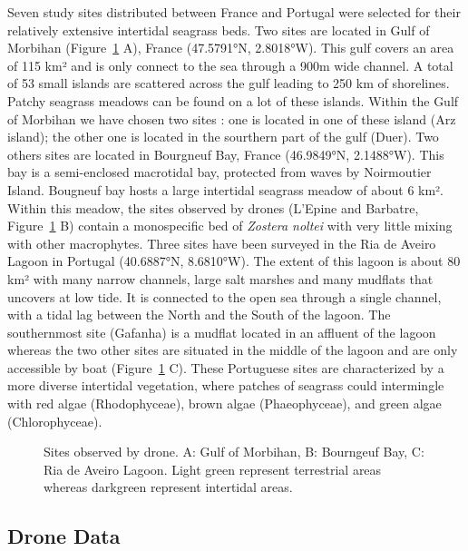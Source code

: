 \documentclass[
  number]{elsarticle}
\begin{document}
Seven study sites distributed between France and Portugal were selected
for their relatively extensive intertidal seagrass beds. Two sites are
located in Gulf of Morbihan (Figure~\ref{fig-map} A), France (47.5791°N,
2.8018°W). This gulf covers an area of 115 km² and is only connect to
the sea through a 900m wide channel. A total of 53 small islands are
scattered across the gulf leading to 250 km of shorelines. Patchy
seagrass meadows can be found on a lot of these islands. Within the Gulf
of Morbihan we have chosen two sites : one is located in one of these
island (Arz island); the other one is located in the sourthern part of
the gulf (Duer). Two others sites are located in Bourgneuf Bay, France
(46.9849°N, 2.1488°W). This bay is a semi-enclosed macrotidal bay,
protected from waves by Noirmoutier Island. Bougneuf bay hosts a large
intertidal seagrass meadow of about 6 km². Within this meadow, the sites
observed by drones (L'Epine and Barbatre, Figure~\ref{fig-map} B)
contain a monospecific bed of \emph{Zostera noltei} with very little
mixing with other macrophytes. Three sites have been surveyed in the Ria
de Aveiro Lagoon in Portugal (40.6887°N, 8.6810°W). The extent of this
lagoon is about 80 km² with many narrow channels, large salt marshes and
many mudflats that uncovers at low tide. It is connected to the open sea
through a single channel, with a tidal lag between the North and the
South of the lagoon. The southernmost site (Gafanha) is a mudflat
located in an affluent of the lagoon whereas the two other sites are
situated in the middle of the lagoon and are only accessible by boat
(Figure~\ref{fig-map} C). These Portuguese sites are characterized by a
more diverse intertidal vegetation, where patches of seagrass could
intermingle with red algae (Rhodophyceae), brown algae (Phaeophyceae),
and green algae (Chlorophyceae).

\label{cell-fig-map}
\begin{figure}[H]


\caption{\label{fig-map}Sites observed by drone. A: Gulf of Morbihan, B:
Bourngeuf Bay, C: Ria de Aveiro Lagoon. Light green represent
terrestrial areas whereas darkgreen represent intertidal areas.}

\end{figure}%

\subsection{Drone Data}\label{drone-data}
\end{document}
